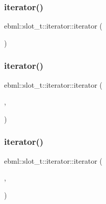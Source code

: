 \subsubsection{\texorpdfstring{iterator()}{iterator()}\hspace{0.1cm}{\footnotesize\ttfamily [1/6]}}
{\footnotesize\ttfamily ebml\+::slot\+\_\+t\+::iterator\+::iterator (\begin{DoxyParamCaption}{ }\end{DoxyParamCaption})\hspace{0.3cm}{\ttfamily [protected]}}

\mbox{\label{classebml_1_1slot__t_1_1iterator_a0984d8894ecc7ec4a705a25d99fc6a58}} 
\subsubsection{\texorpdfstring{iterator()}{iterator()}\hspace{0.1cm}{\footnotesize\ttfamily [2/6]}}
{\footnotesize\ttfamily ebml\+::slot\+\_\+t\+::iterator\+::iterator (\begin{DoxyParamCaption}\item[{\mbox{\hyperlink{classebml_1_1slot__t_1_1iterator_a03124469c35c80a29b81b969706999df}{\+\_\+slot\+\_\+t}} \&}]{,  }\item[{bool}]{ }\end{DoxyParamCaption})\hspace{0.3cm}{\ttfamily [protected]}}

\mbox{\label{classebml_1_1slot__t_1_1iterator_a2da001978feb19887d25232fc13b1c1a}} 
\subsubsection{\texorpdfstring{iterator()}{iterator()}\hspace{0.1cm}{\footnotesize\ttfamily [3/6]}}
{\footnotesize\ttfamily ebml\+::slot\+\_\+t\+::iterator\+::iterator (\begin{DoxyParamCaption}\item[{\mbox{\hyperlink{classebml_1_1slot__t_1_1iterator_a03124469c35c80a29b81b969706999df}{\+\_\+slot\+\_\+t}} \&}]{,  }\item[{const ebml\+Element\+\_\+l\+::iterator \&}]{ }\end{DoxyParamCaption})\hspace{0.3cm}{\ttfamily [protected]}}

